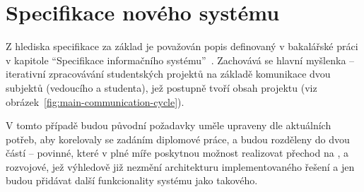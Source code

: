 
\chapter{Specifikace nového systému}\label{ch:spec}


Z hlediska specifikace za základ je považován popis  definovaný v bakalářské práci v kapitole \enquote{Specifikace informačního systému}~\cite{bachelorthesis}.
Zachovává se hlavní myšlenka – iterativní zpracovávání studentských projektů na základě komunikace dvou subjektů (vedoucího a studenta), jež postupně tvoří obsah projektu (viz obrázek~\ref{fig:main-communication-cycle}).

V tomto případě budou původní požadavky uměle upraveny dle aktuálních potřeb, aby korelovaly se zadáním diplomové práce, a budou rozděleny do dvou částí – povinné, které v plné míře poskytnou možnost realizovat přechod na , a rozvojové, jež výhledově již nezmění architekturu implementovaného řešení a jen budou přidávat další funkcionality systému jako takového.

